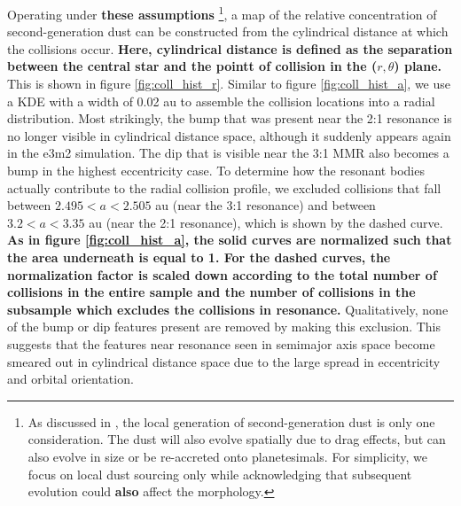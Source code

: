 \documentclass[fleqn,usenatbib]{mnras}
\begin{document}
Operating under \textbf{these assumptions} \footnote{As discussed in \cite{2017ApJ...850..103B}, the local generation of second-generation dust is only one 
consideration. The dust will also evolve spatially due to drag effects, but can also evolve in size or be re-accreted onto planetesimals. For simplicity, 
we focus on local dust sourcing only while acknowledging that subsequent evolution could \textbf{also} affect the morphology.}, a map of the relative concentration 
of second-generation dust can be constructed from the cylindrical distance at which the collisions occur. \textbf{Here, cylindrical distance is defined as the separation between the central star and the pointt of collision in the ($r, \theta$) plane.} This is shown in figure \ref{fig:coll_hist_r}. 
Similar to figure \ref{fig:coll_hist_a}, we use a KDE with a width of 0.02 au to assemble the collision locations into a radial distribution. Most 
strikingly, the bump that was present near the 2:1 resonance is no longer visible in cylindrical distance space, although it suddenly appears again in 
the e3m2 simulation. The dip that is visible near the 3:1 MMR also becomes a bump in the highest eccentricity case. To determine how the resonant 
bodies actually contribute to the radial collision profile, we excluded collisions that fall between $2.495 < a < 2.505$ au (near the 3:1 resonance) and 
between $3.2 < a < 3.35$ au (near the 2:1 resonance), which is shown by the dashed curve. \textbf{As in figure \ref{fig:coll_hist_a}, the solid curves are normalized such that the area underneath is equal to 1. For the dashed curves, the normalization factor is scaled down according to the total number of collisions in the entire sample and the number of collisions in the subsample which excludes the collisions in resonance.} Qualitatively, none of the bump or dip features present 
are removed by making this exclusion. This suggests that the features near resonance seen in semimajor axis space become smeared out in 
cylindrical distance space due to the large spread in eccentricity and orbital orientation.
\end{document}
